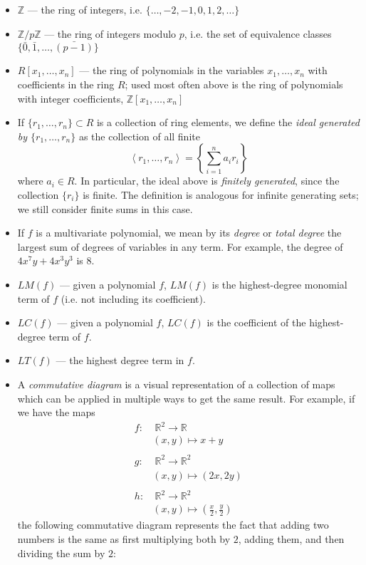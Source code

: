 \documentclass[11pt]{report}
\newcommand{\Z}{\mathbb{Z}}
\newcommand{\R}{\mathbb{R}}
\newcommand{\Zp}{\mathbb{Z}/p\mathbb{Z}}
\newcommand{\lra}{\longrightarrow}
\begin{document}
\begin{itemize}
\item $\Z$ --- the ring of integers, i.e. $\{\dots,  -2, -1, 0, 1, 2, \dots\}$
\item $\Zp$ --- the ring of integers modulo $p$, i.e. the set of equivalence classes $\{\bar{0}, \bar{1}, \dots , \bar{(p-1)}\}$
\item $R[x_1, \dots ,x_n]$ --- the ring of polynomials in the variables $x_1,\dots, x_n$ with coefficients in the ring $R$; used most often above is the ring of polynomials with integer coefficients, $\Z[x_1,\dots,x_n]$
\item If $\{r_1,\dots,r_n\} \subset R$ is a collection of ring elements, we define the \emph{ideal generated by $\{r_1,\dots,r_n\}$} as the collection of all finite
\[ \left\langle r_1,\dots, r_n\right\rangle = \left\{ \sum_{i=1}^n a_ir_i \right\} \]
where $a_i\in R$. In particular, the ideal above is \emph{finitely generated}, since the collection $\{r_i\}$ is finite. The definition is analogous for infinite generating sets; we still consider finite sums in this case.
\item If $f$ is a multivariate polynomial, we mean by its \emph{degree} or \emph{total degree} the largest sum of degrees of variables in any term. For example, the degree of $4x^7y+4x^3y^3$ is 8.
\item $LM(f)$ --- given a polynomial $f$, $LM(f)$ is the highest-degree monomial term of $f$ (i.e. not including its coefficient).
\item $LC(f)$ --- given a polynomial $f$, $LC(f)$ is the coefficient of the highest-degree term of $f$.
\item $LT(f)$ --- the highest degree term in $f$.
\item A \emph{commutative diagram} is a visual representation of a collection of maps which can be applied in multiple ways to get the same result. For example, if we have the maps 
\begin{align*}
f: & \ \R^2 \lra \R\\
&(x,y)\mapsto x+y\\
\\
g : & \ \R^2 \lra \R^2\\
&(x,y)\mapsto (2x,2y)\\
\\
h : & \ \R^2\lra \R^2\\
&(x,y)\mapsto (\frac{x}{2},\frac{y}{2})
\end{align*}
the following commutative diagram represents the fact that adding two numbers is the same as first multiplying both by $2$, adding them, and then dividing the sum by $2$:


\end{itemize}
\end{document}
